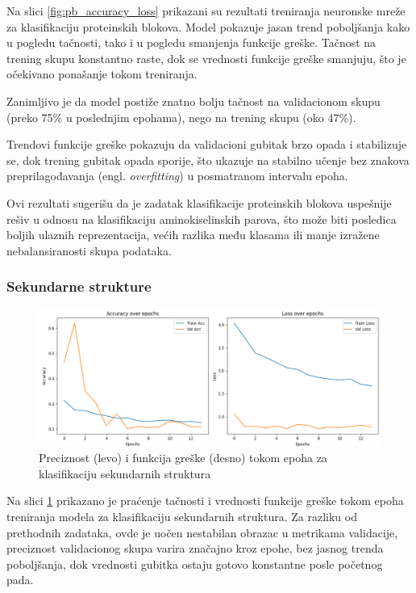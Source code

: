 \documentclass[a4paper,12pt]{article}
\begin{document}
Na slici \ref{fig:pb_accuracy_loss} prikazani su rezultati treniranja neuronske mreže za klasifikaciju proteinskih blokova. Model pokazuje jasan trend poboljšanja kako u pogledu tačnosti, tako i u pogledu smanjenja funkcije greške. Tačnost na trening skupu konstantno raste, dok se vrednosti funkcije greške smanjuju, što je očekivano ponašanje tokom treniranja.

Zanimljivo je da model postiže znatno bolju tačnost na validacionom skupu (preko 75\% u poslednjim epohama), nego na trening skupu (oko 47\%).

Trendovi funkcije greške pokazuju da validacioni gubitak brzo opada i stabilizuje se, dok trening gubitak opada sporije, što ukazuje na stabilno učenje bez znakova preprilagođavanja (engl. \textit{overfitting}) u posmatranom intervalu epoha.

Ovi rezultati sugerišu da je zadatak klasifikacije proteinskih blokova uspešnije rešiv u odnosu na klasifikaciju aminokiselinskih parova, što može biti posledica boljih ulaznih reprezentacija, većih razlika među klasama ili manje izražene nebalansiranosti skupa podataka.

\subsubsection*{Sekundarne strukture}

\begin{figure}[htbp]
    \centering
    \includegraphics[width=1\textwidth]{images/epochs_ss.png}
    \caption{Preciznost (levo) i funkcija greške (desno) tokom epoha za klasifikaciju sekundarnih struktura}
    \label{fig:ss_accuracy_loss}
\end{figure}

Na slici \ref{fig:ss_accuracy_loss} prikazano je praćenje tačnosti i vrednosti funkcije greške tokom epoha treniranja modela za klasifikaciju sekundarnih struktura. Za razliku od prethodnih zadataka, ovde je uočen nestabilan obrazac u metrikama validacije, preciznost validacionog skupa varira značajno kroz epohe, bez jasnog trenda poboljšanja, dok vrednosti gubitka ostaju gotovo konstantne posle početnog pada.
\end{document}

